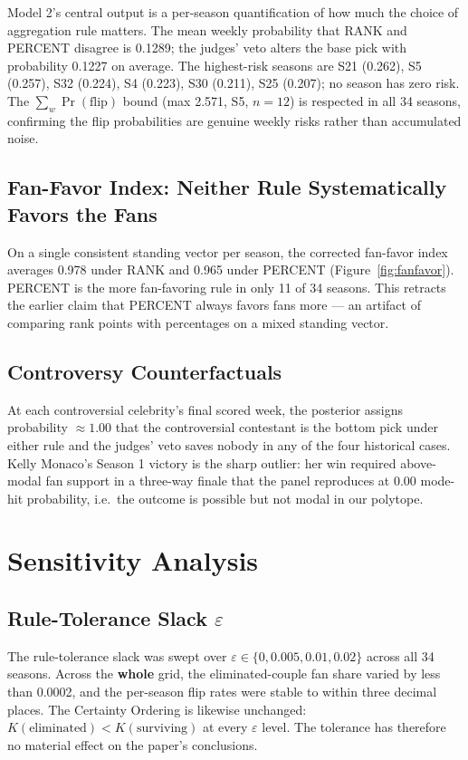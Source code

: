 \documentclass[11pt]{article}
\begin{document}
Model 2's central output is a per-season quantification of how much the choice of aggregation
rule matters. The mean weekly probability that RANK and PERCENT disagree is 0.1289; the judges'
veto alters the base pick with probability 0.1227 on average. The highest-risk seasons are S21
(0.262), S5 (0.257), S32 (0.224), S4 (0.223), S30 (0.211), S25 (0.207); no season has zero risk.
The $\sum_w \Pr(\text{flip})$ bound (max 2.571, S5, $n=12$) is respected in all 34 seasons,
confirming the flip probabilities are genuine weekly risks rather than accumulated noise.

\subsection{Fan-Favor Index: Neither Rule Systematically Favors the Fans}

On a single consistent standing vector per season, the corrected fan-favor index averages 0.978
under RANK and 0.965 under PERCENT (Figure~\ref{fig:fanfavor}). PERCENT is the more fan-favoring
rule in only 11 of 34 seasons. This retracts the earlier claim that PERCENT always favors fans
more --- an artifact of comparing rank points with percentages on a mixed standing vector.

\subsection{Controversy Counterfactuals}

At each controversial celebrity's final scored week, the posterior assigns probability
$\approx 1.00$ that the controversial contestant is the bottom pick under either rule and the
judges' veto saves nobody in any of the four historical cases. Kelly Monaco's Season 1 victory is
the sharp outlier: her win required above-modal fan support in a three-way finale that the panel
reproduces at 0.00 mode-hit probability, i.e.\ the outcome is possible but not modal in our
polytope.

\section{Sensitivity Analysis}
\label{sec:sensitivity}

\subsection{Rule-Tolerance Slack $\varepsilon$}

The rule-tolerance slack was swept over $\varepsilon \in \{0, 0.005, 0.01, 0.02\}$ across all
34 seasons. Across the \textbf{whole} grid, the eliminated-couple fan share varied by less than
0.0002, and the per-season flip rates were stable to within three decimal places. The
Certainty Ordering is likewise unchanged: $K(\text{eliminated}) < K(\text{surviving})$ at every
$\varepsilon$ level. The tolerance has therefore no material effect on the paper's conclusions.
\end{document}
